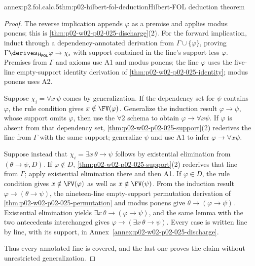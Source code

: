 \begin{annexitem}{annex:p2.fol.calc.5}{thm:p02-hilbert-fol-deduction}{Hilbert-FOL deduction theorem}
\begin{proof}
The reverse implication appends \(\varphi\) as a premise and applies modus
ponens; this is \cref{thm:p02-w02-p02-025-discharge}(2).  For the forward
implication, induct through a dependency-annotated derivation from
\(\Gamma\cup\{\varphi\}\), proving
\(\Gamma\derives_{\mathsf H_{\mathsf{FOL}}}\varphi\to\chi_i\) with support
contained in the line's support less \(\varphi\).  Premises from \(\Gamma\)
and axioms use A1 and modus ponens; the line \(\varphi\) uses the five-line
empty-support identity derivation of \cref{thm:p02-w02-p02-025-identity};
modus ponens uses A2.

Suppose \(\chi_i=\forall x\,\psi\) comes by generalization.  If the
dependency set for \(\psi\) contains \(\varphi\), the rule condition gives
\(x\notin\FV(\varphi)\).  Generalize the induction result
\(\varphi\to\psi\), whose support omits \(\varphi\), then use the \(\forall2\)
schema to obtain \(\varphi\to\forall x\psi\).  If \(\varphi\) is absent from
that dependency set, \cref{thm:p02-w02-p02-025-support}(2) rederives the line
from \(\Gamma\) with the same support; generalize \(\psi\) and use A1 to infer
\(\varphi\to\forall x\psi\).

Suppose instead that \(\chi_i=\exists x\,\theta\to\psi\) follows by
existential elimination from \((\theta\to\psi,D)\).  If
\(\varphi\notin D\), \cref{thm:p02-w02-p02-025-support}(2) rederives that
line from \(\Gamma\); apply existential elimination there and then A1.  If
\(\varphi\in D\), the rule condition gives \(x\notin\FV(\varphi)\) as well as
\(x\notin\FV(\psi)\).  From the induction result
\(\varphi\to(\theta\to\psi)\), the nineteen-line empty-support permutation
derivation of \cref{thm:p02-w02-p02-025-permutation} and modus ponens give
\(\theta\to(\varphi\to\psi)\).  Existential elimination yields
\(\exists x\,\theta\to(\varphi\to\psi)\), and the same lemma with the two
antecedents interchanged gives \(\varphi\to(\exists x\,\theta\to\psi)\).
Every case is written line by line, with its support, in
Annex~\ref{annex:p02-w02-p02-025-discharge}.

  Thus every annotated line is covered, and the
  last one proves the claim without unrestricted generalization.
\end{proof}
\end{annexitem}


